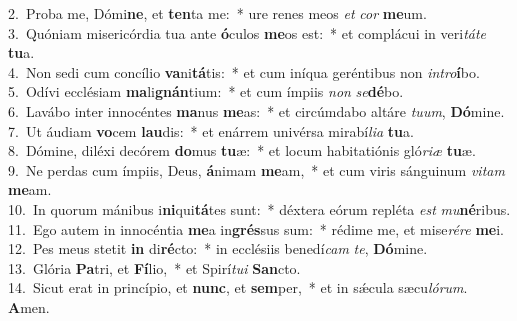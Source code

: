 {2.~}Proba me, Dómi\textbf{ne}, et \textbf{ten}ta me:~* ure renes meos \textit{et} \textit{cor} \textbf{me}um.\\
{3.~}Quóniam misericórdia tua ante \textbf{ó}culos \textbf{me}os est:~* et complácui in veri\textit{tá}\textit{te} \textbf{tu}a.\\
{4.~}Non sedi cum concílio \textbf{va}ni\textbf{tá}tis:~* et cum iníqua geréntibus non \textit{in}\textit{tro}\textbf{í}bo.\\
{5.~}Odívi ecclésiam \textbf{ma}li\textbf{gnán}tium:~* et cum ímpiis \textit{non} \textit{se}\textbf{dé}bo.\\
{6.~}Lavábo inter innocéntes \textbf{ma}nus \textbf{me}as:~* et circúmdabo altáre \textit{tu}\textit{um}, \textbf{Dó}mine.\\
{7.~}Ut áudiam \textbf{vo}cem \textbf{lau}dis:~* et enárrem univérsa mirabí\textit{li}\textit{a} \textbf{tu}a.\\
{8.~}Dómine, diléxi decórem \textbf{do}mus \textbf{tu}æ:~* et locum habitatiónis gló\textit{ri}\textit{æ} \textbf{tu}æ.\\
{9.~}Ne perdas cum ímpiis, Deus, \textbf{á}nimam \textbf{me}am,~* et cum viris sánguinum \textit{vi}\textit{tam} \textbf{me}am.\\
{10.~}In quorum mánibus i\textbf{ni}qui\textbf{tá}tes sunt:~* déxtera eórum repléta \textit{est} \textit{mu}\textbf{né}ribus.\\
{11.~}Ego autem in innocéntia \textbf{me}a in\textbf{grés}sus sum:~* rédime me, et mise\textit{ré}\textit{re} \textbf{me}i.\\
{12.~}Pes meus stetit \textbf{in} di\textbf{ré}cto:~* in ecclésiis benedí\textit{cam} \textit{te}, \textbf{Dó}mine.\\
{13.~}Glória \textbf{Pa}tri, et \textbf{Fí}lio,~* et Spirí\textit{tu}\textit{i} \textbf{San}cto.\\
{14.~}Sicut erat in princípio, et \textbf{nunc}, et \textbf{sem}per,~* et in sǽcula sæcu\textit{ló}\textit{rum}. \textbf{A}men.\\
